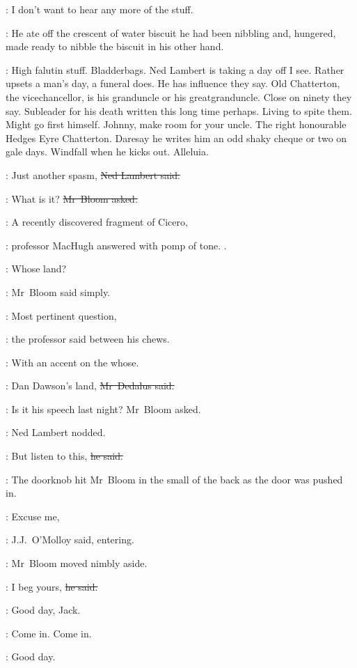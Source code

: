 \machugh:
I don't want to hear any more of the stuff.

:
He ate off the crescent of water biscuit
he had been nibbling
and, hungered,
made ready to nibble the biscuit in his other hand.

\BloomInt:
High falutin stuff.
Bladderbags.
Ned Lambert is taking a day off I see.
Rather upsets a man's day, a funeral does.
He has influence they say.
Old Chatterton, the vicechancellor, is his granduncle or his greatgranduncle.
Close on ninety they say.
Subleader for his death written this long time perhaps.
Living to spite them.
Might go first himself.
Johnny, make room for your uncle.
The right honourable Hedges Eyre Chatterton.
Daresay he writes him an odd shaky cheque or two on gale days.
Windfall when he kicks out. Alleluia.

\lambert:
Just another spasm,
\sout{Ned Lambert said.}

\Bloom:
What is it?
\sout{Mr~Bloom asked.}

\machugh:
A recently discovered fragment of Cicero,

:
professor MacHugh answered
with pomp of tone.
.



\Bloom:
Whose land?

:
Mr~Bloom said simply.

\machugh:
Most pertinent question,

:
the professor said between his chews.

\machugh:
With an accent on the whose.

\simon:
Dan Dawson's land,
\sout{Mr~Dedalus said.}

\Bloom:
Is it his speech last night?
Mr~Bloom asked.

:
Ned Lambert nodded.

\lambert:
But listen to this,
\sout{he said.}

:
The doorknob hit Mr~Bloom in the small of the back
as the door was pushed in.

\jjom:
Excuse me,

:
J.J.~O'Molloy said,
entering.

:
Mr~Bloom moved nimbly aside.

\Bloom:
I beg yours,
\sout{he said.}

\lambert:
Good day,
Jack.

\simon:
Come in.
Come in.

\machugh:
Good day.

